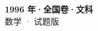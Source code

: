 \documentclass[zihao=-4, a4paper]{ctexart}
\begin{document}
\begin{center}
  {\Large\bfseries 1996 年·全国卷·文科}\\[4pt]
  {\large 数学 · 试题版}
\end{center}
\medskip
{}

\end{document}
